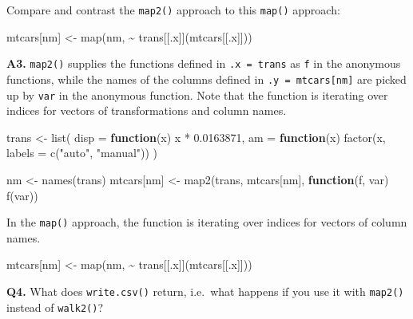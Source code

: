 \documentclass[
]{book}
\newenvironment{Shaded}{\begin{snugshade}}{\end{snugshade}}
\newcommand{\AttributeTok}[1]{\textcolor[rgb]{0.77,0.63,0.00}{#1}}
\newcommand{\ControlFlowTok}[1]{\textcolor[rgb]{0.13,0.29,0.53}{\textbf{#1}}}
\newcommand{\FloatTok}[1]{\textcolor[rgb]{0.00,0.00,0.81}{#1}}
\newcommand{\FunctionTok}[1]{\textcolor[rgb]{0.00,0.00,0.00}{#1}}
\newcommand{\NormalTok}[1]{#1}
\newcommand{\OtherTok}[1]{\textcolor[rgb]{0.56,0.35,0.01}{#1}}
\newcommand{\SpecialCharTok}[1]{\textcolor[rgb]{0.00,0.00,0.00}{#1}}
\newcommand{\StringTok}[1]{\textcolor[rgb]{0.31,0.60,0.02}{#1}}
\begin{document}
Compare and contrast the \texttt{map2()} approach to this \texttt{map()} approach:

\begin{Shaded}
\begin{Highlighting}[]
\NormalTok{mtcars[nm] }\OtherTok{\textless{}{-}} \FunctionTok{map}\NormalTok{(nm, }\SpecialCharTok{\textasciitilde{}}\NormalTok{ trans[[.x]](mtcars[[.x]]))}
\end{Highlighting}
\end{Shaded}

\textbf{A3.} \texttt{map2()} supplies the functions defined in \texttt{.x\ =\ trans} as \texttt{f} in the anonymous functions, while the names of the columns defined in \texttt{.y\ =\ mtcars{[}nm{]}} are picked up by \texttt{var} in the anonymous function. Note that the function is iterating over indices for vectors of transformations and column names.

\begin{Shaded}
\begin{Highlighting}[]
\NormalTok{trans }\OtherTok{\textless{}{-}} \FunctionTok{list}\NormalTok{(}
  \AttributeTok{disp =} \ControlFlowTok{function}\NormalTok{(x) x }\SpecialCharTok{*} \FloatTok{0.0163871}\NormalTok{,}
  \AttributeTok{am =} \ControlFlowTok{function}\NormalTok{(x) }\FunctionTok{factor}\NormalTok{(x, }\AttributeTok{labels =} \FunctionTok{c}\NormalTok{(}\StringTok{"auto"}\NormalTok{, }\StringTok{"manual"}\NormalTok{))}
\NormalTok{)}

\NormalTok{nm }\OtherTok{\textless{}{-}} \FunctionTok{names}\NormalTok{(trans)}
\NormalTok{mtcars[nm] }\OtherTok{\textless{}{-}} \FunctionTok{map2}\NormalTok{(trans, mtcars[nm], }\ControlFlowTok{function}\NormalTok{(f, var) }\FunctionTok{f}\NormalTok{(var))}
\end{Highlighting}
\end{Shaded}

In the \texttt{map()} approach, the function is iterating over indices for vectors of column names.

\begin{Shaded}
\begin{Highlighting}[]
\NormalTok{mtcars[nm] }\OtherTok{\textless{}{-}} \FunctionTok{map}\NormalTok{(nm, }\SpecialCharTok{\textasciitilde{}}\NormalTok{ trans[[.x]](mtcars[[.x]]))}
\end{Highlighting}
\end{Shaded}

\textbf{Q4.} What does \texttt{write.csv()} return, i.e.~what happens if you use it with \texttt{map2()} instead of \texttt{walk2()}?
\end{document}
